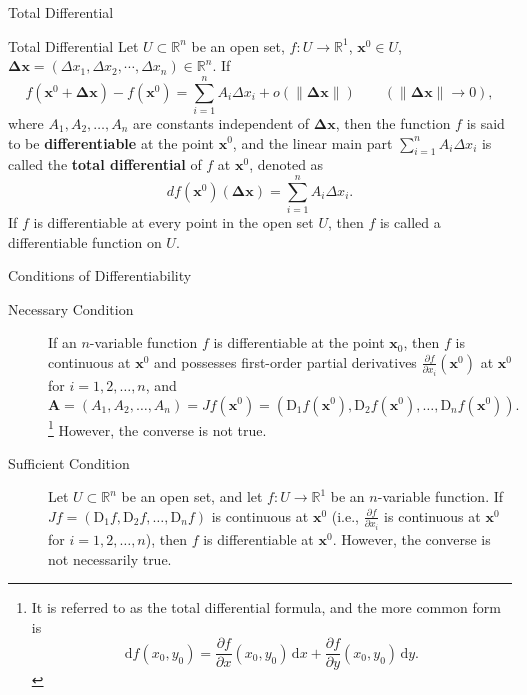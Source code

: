 \documentclass[11pt]{elegantbook}
\begin{document}
\begin{leftbarTitle}{Total Differential}\end{leftbarTitle}
\begin{definition}{Total Differential}
    Let \(U\subset \mathbb{R}^n\) be an open set, \(f: U\to \mathbb{R}^{1}\), \(\mathbf{x}^{0}\in U\),
    \(\mathbf{\Delta x}=\left( \Delta x_{1},\Delta x_{2},\cdots,\Delta x_{n} \right) \in \mathbb{R}^{n}\). If
    \[
    f(\mathbf{x}^{0} + \mathbf{\Delta x}) - f(\mathbf{x}^{0}) = 
    \sum_{i=1}^n A_{i} \Delta x_{i} + o(\|\mathbf{\Delta x}\|) \qquad (\|\mathbf{\Delta x}\| \to 0),
    \]
    where \(A_{1}, A_{2}, \dots, A_{n}\) are constants independent of \(\mathbf{\Delta x}\), 
    then the function \(f\) is said to be \textbf{differentiable} at the point \(\mathbf{x}^{0}\), 
    and the linear main part \(\sum_{i=1}^n A_{i} \Delta x_{i}\) is called the \textbf{total differential} 
    of \(f\) at \(\mathbf{x}^{0}\), 
    denoted as
    \[
    df(\mathbf{x}^{0})(\mathbf{\Delta x}) = \sum_{i=1}^n A_{i} \Delta x_{i}.
    \]
    If \(f\) is differentiable at every point in the open set \(U\), 
    then \(f\) is called a differentiable function on \(U\).    
\end{definition}

\begin{theorem}{Conditions of Differentiability}
    \begin{description}
        \item[Necessary Condition] If an \(n\)-variable function \(f\) is differentiable at the point \(\mathbf{x}_{0}\), 
        then \(f\) is continuous at \(\mathbf{x}^{0}\) and 
        possesses first-order partial derivatives \(\frac{\partial f}{\partial x_{i}}(\mathbf{x}^{0})\) 
        at \(\mathbf{x}^{0}\) for \(i = 1, 2, \dots, n\), and
        \[
        \mathbf{A} = \left( A_{1}, A_{2}, \dots, A_{n} \right)  = Jf(\mathbf{x}^{0}) = 
        \left(\mathrm{D}_{1}f(\mathbf{x}^{0}), \mathrm{D}_{2}f(\mathbf{x}^{0}), \dots, \mathrm{D}_{n}f(\mathbf{x}^{0}) \right).
        \]\footnote{
            It is referred to as the total differential formula, and the more common form is
            \[
                \mathrm{d}f(x_{0},y_{0})=
                \frac{\partial f}{\partial x}(x_{0},y_{0})\,\mathrm{d}x+\frac{\partial f}{\partial y}(x_{0},y_{0})\,\mathrm{d}y.
            \]
        }
        However, the converse is not true.
        \item[Sufficient Condition] Let \(U \subset \mathbb{R}^n\) be an open set, 
        and let \(f: U \to \mathbb{R}^1\) be an \(n\)-variable function. 
        If \(Jf = \left( \mathrm{D}_{1}f, \mathrm{D}_{2}f, \dots, \mathrm{D}_{n}f \right)\) 
        is continuous at \(\mathbf{x}^{0}\) 
        (i.e., \(\frac{\partial f}{\partial x_{i}}\) is continuous at \(\mathbf{x}^{0}\) for \(i = 1, 2, \dots, n\)), 
        then \(f\) is differentiable at \(\mathbf{x}^{0}\).
        However, the converse is not necessarily true.
    \end{description}    
\end{theorem}
\end{document}
